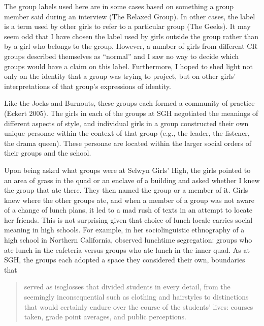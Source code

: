 The group labels used here are in some cases based on something a group member said during an interview (The Relaxed Group).  In other cases, the label is a term used by other girls to refer to a particular group (The Geeks). It may seem odd that I have chosen the label used by girls outside the group rather than by a girl who belongs to the group.  However, a number of girls from different CR groups described themselves as ``normal'' and I saw no way to decide which groups would have a claim on this label.  Furthermore, I hoped to shed light not only on the identity that a group was trying to project, but on other girls' interpretations of that group's expressions of identity.  



Like the Jocks and Burnouts, these groups each formed a community of practice (Eckert 2005).  The girls in each of the groups at SGH negotiated the meanings of different aspects of style, and individual girls in a group constructed their own unique personae within the context of that group (e.g., the leader, the listener, the drama queen).  These personae are located within the larger social orders of their groups and the school.

Upon being asked what groups were at Selwyn Girls' High, the girls pointed to an area of grass in the quad or an enclave of a building and asked whether I knew the group that ate there.  They then named the group or a member of it.  Girls knew where the other groups ate, and when a member of a group was not aware of a change of lunch plans, it led to a mad rush of texts in an attempt to locate her friends.  This is not surprising given that choice of lunch locale carries social meaning in high schools.  For example, in her sociolinguistic ethnography of a high school in Northern California,  observed lunchtime segregation: groups who ate lunch in the cafeteria versus groups who ate lunch in the inner quad.  As at SGH, the groups each adopted a space they considered their own, boundaries that

\begin{quote}
	served as isoglosses that divided students in every detail, from the seemingly inconsequential such as clothing and hairstyles to distinctions that would certainly endure over the course of the students' lives: courses taken, grade point averages, and public perceptions.  \cite[25-29]{mendozadenton2008}
\end{quote}


